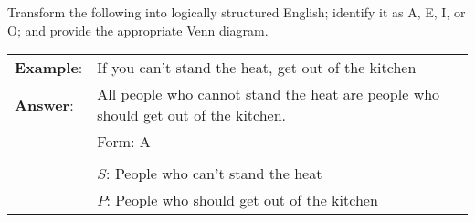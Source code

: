 
\practiceproblems
\noindent\problempart Transform the following into logically structured English; identify it as A, E, I, or O; and provide the appropriate Venn diagram.


\begin{longtabu}{p{.1\linewidth}p{.9\linewidth}}
\textbf{Example}: & If you can't stand the heat, get out of the kitchen \\
\textbf{Answer}:  & All people who cannot stand the heat are people who should get out of the kitchen. \\
& Form: A\\
&
\noindent {}\\
& $S$: People who can't stand the heat\\
& $P$: People who should get out of the kitchen

\end{longtabu}

